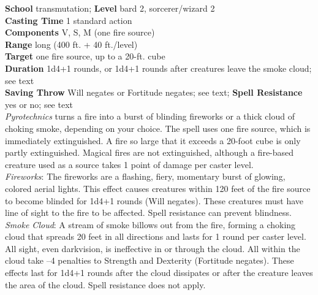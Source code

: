 \textbf{School} transmutation; \textbf{Level} bard 2, sorcerer/wizard 2\\
\textbf{Casting Time} 1 standard action\\
\textbf{Components} V, S, M (one fire source)\\
\textbf{Range} long (400 ft. + 40 ft./level)\\
\textbf{Target} one fire source, up to a 20-ft. cube\\
\textbf{Duration} 1d4+1 rounds, or 1d4+1 rounds after creatures leave the smoke cloud; see text\\
\textbf{Saving Throw }Will negates or Fortitude negates; see text; \textbf{Spell Resistance} yes or no; see text\\
\textit{Pyrotechnics }turns a fire into a burst of blinding fireworks or a thick cloud of choking smoke, depending on your choice. The spell uses one fire source, which is immediately extinguished. A fire so large that it exceeds a 20-foot cube is only partly extinguished. Magical fires are not extinguished, although a fire-based creature used as a source takes 1 point of damage per caster level.\\
\textit{Fireworks}: The fireworks are a flashing, fiery, momentary burst of glowing, colored aerial lights. This effect causes creatures within 120 feet of the fire source to become blinded for 1d4+1 rounds (Will negates). These creatures must have line of sight to the fire to be affected. Spell resistance can prevent blindness.\\
\textit{Smoke Cloud}: A stream of smoke billows out from the fire, forming a choking cloud that spreads 20 feet in all directions and lasts for 1 round per caster level. All sight, even darkvision, is ineffective in or through the cloud. All within the cloud take --4 penalties to Strength and Dexterity (Fortitude negates). These effects last for 1d4+1 rounds after the cloud dissipates or after the creature leaves the area of the cloud. Spell resistance does not apply.\\
